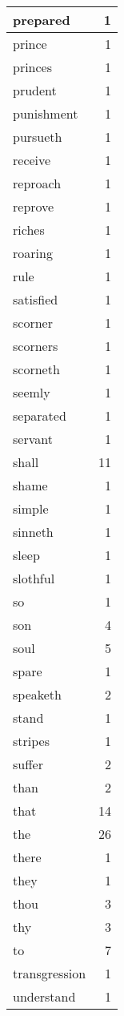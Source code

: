 \begin{center}
\begin{longtable}{l|r}
prepared & 1\\ \hline 
prince & 1\\ \hline 
princes & 1\\ \hline 
prudent & 1\\ \hline 
punishment & 1\\ \hline 
pursueth & 1\\ \hline 
receive & 1\\ \hline 
reproach & 1\\ \hline 
reprove & 1\\ \hline 
riches & 1\\ \hline 
roaring & 1\\ \hline 
rule & 1\\ \hline 
satisfied & 1\\ \hline 
scorner & 1\\ \hline 
scorners & 1\\ \hline 
scorneth & 1\\ \hline 
seemly & 1\\ \hline 
separated & 1\\ \hline 
servant & 1\\ \hline 
shall & 11\\ \hline 
shame & 1\\ \hline 
simple & 1\\ \hline 
sinneth & 1\\ \hline 
sleep & 1\\ \hline 
slothful & 1\\ \hline 
so & 1\\ \hline 
son & 4\\ \hline 
soul & 5\\ \hline 
spare & 1\\ \hline 
speaketh & 2\\ \hline 
stand & 1\\ \hline 
stripes & 1\\ \hline 
suffer & 2\\ \hline 
than & 2\\ \hline 
that & 14\\ \hline 
the & 26\\ \hline 
there & 1\\ \hline 
they & 1\\ \hline 
thou & 3\\ \hline 
thy & 3\\ \hline 
to & 7\\ \hline 
transgression & 1\\ \hline 
understand & 1\\ \hline 

\end{longtable}
\end{center}
